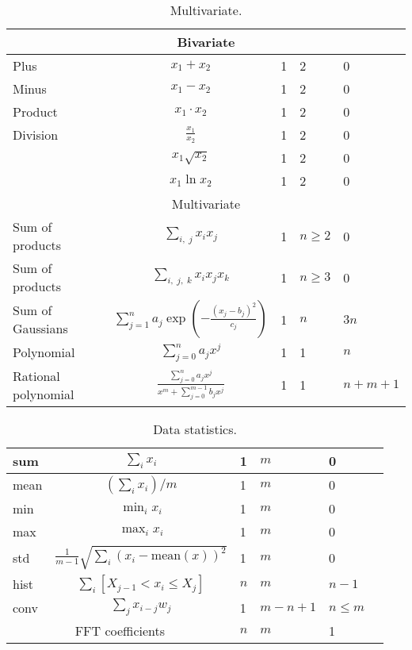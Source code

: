 \documentclass[12pt]{article}
\begin{document}
\begin{table}[!ht]
\caption{Multivariate.}
\label{tb:variable}
\begin{tabular}{|p{90pt}|c|p{50pt}|p{50pt}|p{50pt}|}
\hline
\multicolumn{5}{|c|}{Bivariate} \\
\hline
Plus	&	$	x_1 + x_2	$	&	1	&	2	&	0	\\ \hline
Minus	&	$	x_1 - x_2	$	&	1	&	2	&	0	\\ \hline
Product	&	$	x_1 \cdot x_2	$	&	1	&	2	&	0	\\ \hline
Division	&	$	\frac{x_1}{x_2}	$	&	1	&	2	&	0	\\ \hline
	&	$	x_1\sqrt{x_2}	$	&	1	&	2	&	0	\\ \hline
	&	$	x_1\ln{x_2}	$	&	1	&	2	&	0	\\ \hline
\multicolumn{5}{|c|}{Multivariate} \\
\hline
Sum of products	&	$\sum_{i,\;j}x_ix_j	$	&	1	&	$n\geq 2$	&	0	\\ \hline
Sum of products	&	$\sum_{i,\;j,\;k}x_ix_jx_k$	&	1	&	$n\geq 3$	&	0	\\ \hline
Sum of Gaussians	&	$	\sum_{j=1}^n a_j\exp(-\frac{(x_j-b_j)^2}{c_j})	$	&	1	&	$n$	&	$3n$	\\ \hline
Polynomial	&	$	\sum_{j=0}^n a_jx^j	$	&	1	&	1	&	$n$	\\ \hline
Rational polynomial	&	$	\frac{\sum_{j=0}^n a_jx^j}{x^m + \sum_{j=0}^{m-1}b_jx^j}	$	&	1	&	1	&	$n + m + 1$	\\ \hline
\end{tabular}
\end{table}

\begin{table}[!ht]
\caption{Data statistics.}
\label{tb:elemetaries}
\begin{tabular}{|p{90pt}|c|p{50pt}|p{50pt}|p{50pt}|p{60pt}|}
\hline
sum	&	$	\sum_i x_i	$	&	1	&	$m$	&	0	\\ \hline
mean	&	$	(\sum_i x_i)/m	$	&	1	&	$m$	&	0	\\ \hline
min	&	$	\min_i x_i	$	&	1	&	$m$	&	0	\\ \hline
max	&	$	\max_i x_i	$	&	1	&	$m$	&	0	\\ \hline
std	&	$	\frac{1}{m-1}\sqrt{\sum_i(x_i - \text{mean}(x))^2}	$	&	1	&	$m$	&	0	\\ \hline
hist &	$	\sum_i [X_{j-1} < x_i \leq X_j ]	$	&	$n$	&	$m$	&	$n-1$	\\ \hline
conv &	$	\sum_j x_{i-j}w_j 	$	&	1	&	$m- n + 1$	&	$n \leq m$	\\ \hline
\multicolumn{2}{|c|}{FFT coefficients}	&	$n$	&	$m$	&	1	\\ \hline

\end{tabular}
\end{table}
\end{document}
